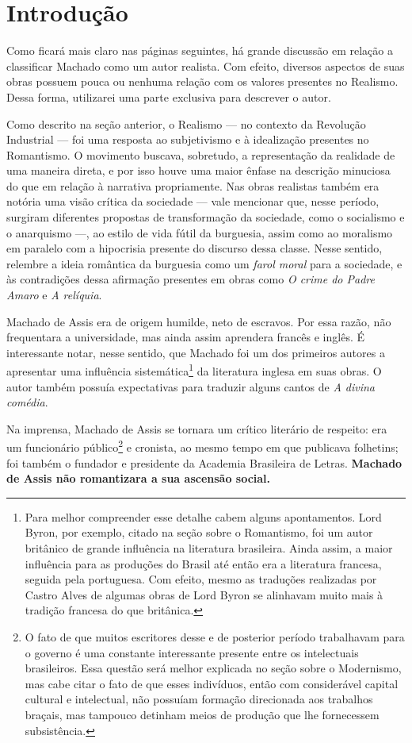 
\chapter{Introdução}

Como ficará mais claro nas páginas seguintes, há grande discussão em relação a classificar Machado como um autor realista. Com efeito, diversos aspectos de suas obras possuem pouca ou nenhuma relação com os valores presentes no Realismo. Dessa forma, utilizarei uma parte exclusiva para descrever o autor.

Como descrito na seção anterior, o Realismo — no contexto da Revolução Industrial — foi uma resposta ao subjetivismo e à idealização presentes no Romantismo. O movimento buscava, sobretudo, a representação da realidade de uma maneira direta, e por isso houve uma maior ênfase na descrição minuciosa do que em relação à narrativa propriamente. Nas obras realistas também era notória uma visão crítica da sociedade — vale mencionar que, nesse período, surgiram diferentes propostas de transformação da sociedade, como o socialismo e o anarquismo —, ao estilo de vida fútil da burguesia, assim como ao moralismo em paralelo com a hipocrisia presente do discurso dessa classe. Nesse sentido, relembre a ideia romântica da burguesia como um \textit{farol moral} para a sociedade, e às contradições dessa afirmação presentes em obras como \textit{O crime do Padre Amaro} e \textit{A relíquia}.

Machado de Assis era de origem humilde, neto de escravos. Por essa razão, não frequentara a universidade, mas ainda assim aprendera francês e inglês. É interessante notar, nesse sentido, que Machado foi um dos primeiros autores a apresentar uma influência sistemática\footnote{Para melhor compreender esse detalhe cabem alguns apontamentos. Lord Byron, por exemplo, citado na seção sobre o Romantismo, foi um autor britânico de grande influência na literatura brasileira. Ainda assim, a maior influência para as produções do Brasil até então era a literatura francesa, seguida pela portuguesa. Com efeito, mesmo as traduções realizadas por Castro Alves de algumas obras de Lord Byron se alinhavam muito mais à tradição francesa do que britânica.} da literatura inglesa em suas obras. O autor também possuía expectativas para traduzir alguns cantos de \textit{A divina comédia}.

Na imprensa, Machado de Assis se tornara um crítico literário de respeito: era um funcionário público\footnote{O fato de que muitos escritores desse e de posterior período trabalhavam para o governo é uma constante interessante presente entre os intelectuais brasileiros. Essa questão será melhor explicada no seção sobre o Modernismo, mas cabe citar o fato de que esses indivíduos, então com considerável capital cultural e intelectual, não possuíam formação direcionada aos trabalhos braçais, mas tampouco detinham meios de produção que lhe fornecessem subsistência.} e cronista, ao mesmo tempo em que publicava folhetins; foi também o fundador e presidente da Academia Brasileira de Letras. \textbf{Machado de Assis não romantizara a sua ascensão social.}

